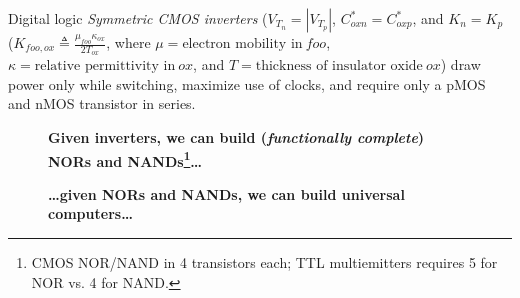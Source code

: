 \documentclass[mathserif,xcolor={dvipsnames,table}]{beamer}
\begin{document}
\begin{frame}{Digital logic}
\tiny{\textit{Symmetric CMOS inverters} ($V_{T_{n}} = |V_{T_{p}}|$,
$C^{*}_{oxn} = C^{*}_{oxp}$, and
$K_n = K_p$ ($K_{foo,ox}\triangleq \frac{\mu_{foo}\kappa_{ox}}{2T_{ox}}$,
where $\mu = \text{electron mobility in}\ foo$,
$\kappa = \text{relative permittivity in}\ ox$,
and $T = \text{thickness of insulator oxide}\ ox$)
draw power only while switching, maximize use of clocks, and require only 
a pMOS and nMOS transistor in series.}
\begin{figure}
\begin{center}
\end{center}
\tiny{\textbf{Given inverters, we can build (\textit{functionally complete}) NORs and NANDs\footnote{\tiny{CMOS NOR/NAND in 4 transistors each; TTL multiemitters requires 5 for NOR vs. 4 for NAND.}}\ldots}}
\end{figure}
\begin{figure}
\begin{center}
\end{center}
\tiny{\textbf{\ldots given NORs and NANDs, we can build universal computers\ldots}}
\end{figure}


\end{frame}
\end{document}
